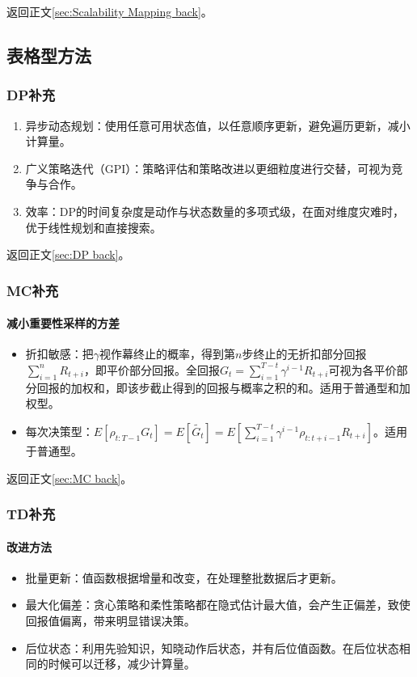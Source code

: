 \documentclass[
12pt, %
a4paper, 
oneside, %
headinclude,footinclude, %
]{scrartcl}
\begin{document}
返回正文\ref{sec:Scalability Mapping back}。
\subsection[表格型方法]{表格型方法}
\subsubsection[DP补充]{DP补充}\label{sec:DP}
\begin{enumerate}
\item 异步动态规划：使用任意可用状态值，以任意顺序更新，避免遍历更新，减小计算量。
\item 广义策略迭代（GPI）：策略评估和策略改进以更细粒度进行交替，可视为竞争与合作。
\item 效率：DP的时间复杂度是动作与状态数量的多项式级，在面对维度灾难时，优于线性规划和直接搜索。
\end{enumerate}

返回正文\ref{sec:DP back}。
\subsubsection[MC补充]{MC补充}
\paragraph{减小重要性采样的方差}\label{sec:MC}
\begin{itemize}
\item 折扣敏感：把$ \gamma $视作幕终止的概率，得到第$ n $步终止的无折扣部分回报$ \sum_{i = 1}^n R_{t + i} $，即平价部分回报。全回报$ G_t = \sum_{i = 1}^{T - t} \gamma^{i - 1}R_{t + i} $可视为各平价部分回报的加权和，即该步截止得到的回报与概率之积的和。适用于普通型和加权型。
\item 每次决策型：$ E[\rho_{t:T - 1}G_t] = E[\tilde{G_t}] = E[\sum_{i = 1}^{T - t} \gamma^{i - 1} \rho_{t:t + i - 1}R_{t + i}] $。适用于普通型。
\end{itemize}

返回正文\ref{sec:MC back}。
\subsubsection[TD补充]{TD补充}\label{sec:TD}
\paragraph{改进方法}
\begin{itemize}
\item 批量更新：值函数根据增量和改变，在处理整批数据后才更新。
\item 最大化偏差：贪心策略和柔性策略都在隐式估计最大值，会产生正偏差，致使回报值偏离，带来明显错误决策。
\item 后位状态：利用先验知识，知晓动作后状态，并有后位值函数。在后位状态相同的时候可以迁移，减少计算量。
\end{itemize}
\end{document}
